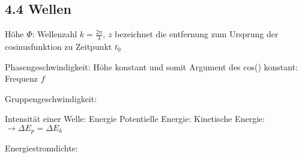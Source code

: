 \subsection*{4.4 Wellen}
    Höhe $\Phi$:
    Wellenzahl $k = \frac{2 \pi}{\lambda}$, $z$ bezeichnet die entfernung zum Ursprung der cosinusfunktion zu Zeitpunkt $t_0$

    Phasengeschwindigkeit: Höhe konstant und somit Argument des cos() konstant:
    Frequenz $f$

    Gruppengeschwindigkeit:


    Intensität einer Welle: Energie
    Potentielle Energie:
    Kinetische Energie:
    $\rightarrow \Delta E_p = \Delta E_k$  

    Energiestromdichte:
